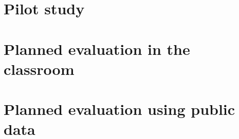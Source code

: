 \section{Pilot study}

\section{Planned evaluation in the classroom}

\section{Planned evaluation using public data}
